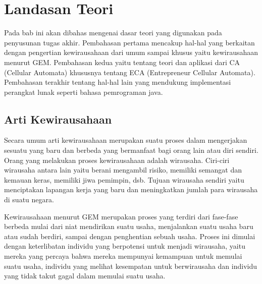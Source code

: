 \chapter{Landasan Teori}
\label{chap:teori}


 
Pada bab ini akan dibahas mengenai dasar teori yang digunakan pada penyusunan tugas akhir. Pembahasan pertama mencakup hal-hal yang berkaitan dengan pengertian kewirausahaan dari umum sampai khusus yaitu kewirausahaan menurut GEM. Pembahasan kedua yaitu tentang teori dan aplikasi dari CA (Cellular Automata) khususnya tentang ECA (Entrepreneur Cellular Automata). Pembahasan terakhir tentang hal-hal lain yang mendukung implementasi perangkat lunak seperti bahasa pemrograman java.


\section{Arti Kewirausahaan}
\label{sec:artiwirausaha}

\graphicspath{{images/}}

Secara umum arti kewirausahaan merupakan suatu proses dalam mengerjakan sesuatu yang baru dan berbeda yang bermanfaat bagi orang lain atau diri sendiri. Orang yang melakukan proses kewirausahaan adalah wirausaha. Ciri-ciri wirausaha antara lain yaitu berani mengambil risiko, memiliki semangat dan kemauan keras, memiliki jiwa pemimpin, dsb. Tujuan wirausaha sendiri yaitu menciptakan lapangan kerja yang baru dan meningkatkan jumlah para wirausaha di suatu negara.


Kewirausahaan menurut GEM merupakan proses yang terdiri dari fase-fase berbeda mulai dari niat mendirikan suatu usaha, menjalankan suatu usaha baru atau sudah berdiri, sampai dengan penghentian sebuah usaha. Proses ini dimulai dengan keterlibatan individu yang berpotensi untuk menjadi wirausaha, yaitu mereka yang percaya bahwa mereka mempunyai kemampuan untuk memulai suatu usaha, individu yang melihat kesempatan untuk berwirausaha dan individu yang tidak takut gagal dalam memulai suatu usaha.



